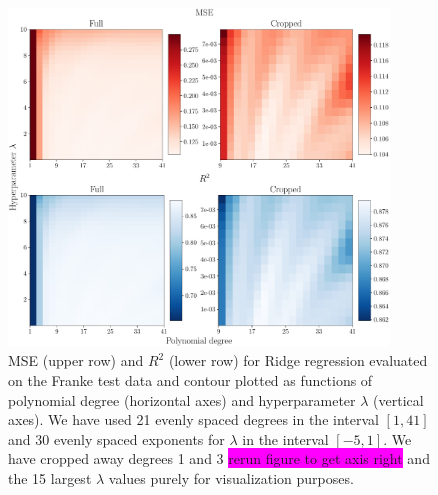 \documentclass[aps,pra,english,notitlepage,reprint,nofootinbib]{revtex4-1}  %
\begin{document}
\begin{figure}
  \vspace*{-5pt}
  \centering %
  \includegraphics[width=0.9\textwidth]{../figs/b_MSE_R2.pdf}
  \caption{MSE (upper row) and $R^2$ (lower row) for Ridge regression evaluated on the Franke test data and contour plotted as functions of polynomial degree (horizontal axes) and hyperparameter $\lambda$ (vertical axes). We have used 21 evenly spaced degrees in the interval $[1, 41]$ and 30 evenly spaced exponents for $\lambda$ in the interval $[-5,1]$. We have cropped away degrees 1 and 3 \colorbox{magenta}{rerun figure to get axis right} and the 15 largest $\lambda$ values purely for visualization purposes.}\label{fig:b MSE R2}
  \vspace*{-5pt}
\end{figure}
\end{document}
